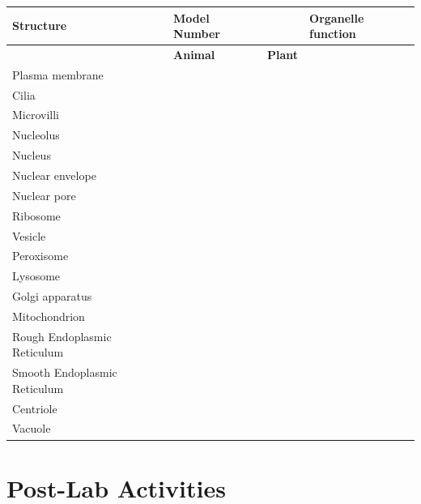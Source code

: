 \documentclass[
  letterpaper,
  DIV=11,
  numbers=noendperiod]{scrreprt}
\newcounter{none} %
\begin{document}
{\def\LTcaptype{none} %
\begin{longtable}[]{@{}
  >{\raggedright\arraybackslash}p{}
  >{\centering\arraybackslash}p{}
  >{\raggedright\arraybackslash}p{}
  >{\raggedright\arraybackslash}p{}@{}}
\toprule\noalign{}
\begin{minipage}[b]{\linewidth}\raggedright
\textbf{Structure}
\end{minipage} & \begin{minipage}[b]{\linewidth}\centering
\textbf{Model Number}
\end{minipage} & \begin{minipage}[b]{\linewidth}\raggedright
\end{minipage} & \begin{minipage}[b]{\linewidth}\raggedright
\textbf{Organelle function}
\end{minipage} \\
\midrule\noalign{}
\endhead
\bottomrule\noalign{}
\endlastfoot
& \textbf{Animal} & \textbf{Plant} & \\
Plasma membrane & & & \\
Cilia & & & \\
Microvilli & & & \\
Nucleolus & & & \\
Nucleus & & & \\
Nuclear envelope & & & \\
Nuclear pore & & & \\
Ribosome & & & \\
Vesicle & & & \\
Peroxisome & & & \\
Lysosome & & & \\
Golgi apparatus & & & \\
Mitochondrion & & & \\
Rough Endoplasmic Reticulum & & & \\
Smooth Endoplasmic Reticulum & & & \\
Centriole & & & \\
Vacuole & & & \\
\end{longtable}
}

\section{\texorpdfstring{\textbf{Post-Lab
Activities}}{Post-Lab Activities}}\label{post-lab-activities-1}
\end{document}
